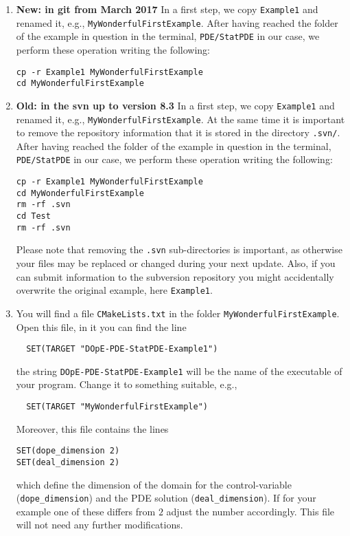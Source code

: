\begin{enumerate}
\item \textbf{New: in git from March 2017} In a first step, we copy \texttt{Example1} and renamed it, e.g., 
\texttt{MyWonderfulFirstExample}. 
After having reached the folder of the example in question in the terminal, 
\texttt{PDE/StatPDE} in our case, we perform these operation writing the following:
\begin{verbatim}
cp -r Example1 MyWonderfulFirstExample
cd MyWonderfulFirstExample
\end{verbatim}


 \item \textbf{Old: in the svn up to version 8.3} In a first step, we copy \texttt{Example1} and renamed it, e.g., 
\texttt{MyWonderfulFirstExample}. At the same time it is important to remove the repository 
information that it is stored in the directory \texttt{.svn/}. \\
After having reached the folder of the example in question in the terminal, 
\texttt{PDE/StatPDE} in our case, we perform these operation writing the following:
\begin{verbatim}
cp -r Example1 MyWonderfulFirstExample
cd MyWonderfulFirstExample
rm -rf .svn
cd Test
rm -rf .svn
\end{verbatim}
Please note that removing the \texttt{.svn} sub-directories is important,
as otherwise your files may be replaced or changed during your next
update. Also, if you can submit information to the subversion repository 
you might accidentally overwrite the original example, here \texttt{Example1}.

\item You will find a file \texttt{CMakeLists.txt} in the folder 
\texttt{MyWonderfulFirstExample}. Open this file, in it you can 
find the line 
\begin{verbatim}
  SET(TARGET "DOpE-PDE-StatPDE-Example1")
\end{verbatim}
the string \texttt{DOpE-PDE-StatPDE-Example1} will be the name of the
executable of your program. Change it to something suitable, e.g.,
\begin{verbatim}
  SET(TARGET "MyWonderfulFirstExample")
\end{verbatim}
Moreover, this file contains the lines 
\begin{verbatim}
SET(dope_dimension 2)
SET(deal_dimension 2)
\end{verbatim}
which define the dimension of the domain for the control-variable
(\texttt{dope\_dimension})
and the PDE solution (\texttt{deal\_dimension}). If for your example 
one of these differs from $2$ adjust the number accordingly.
This file will not need any further modifications.


\end{enumerate}
